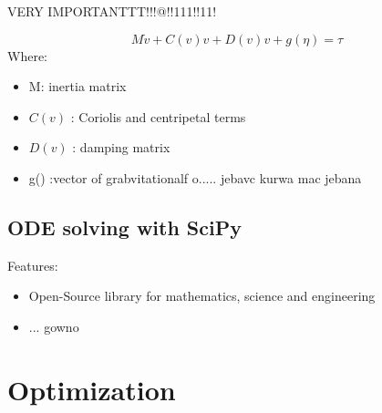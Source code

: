 VERY IMPORTANTTT!!!@!!111!!11!


{

    \begin{equation}
        M\dot{v} + C(v)v + D(v)v + g(\eta) = \tau
    \end{equation}
    Where:
    \begin{itemize}
        \item M: inertia matrix\\
        \item $C(v)$ : Coriolis and centripetal terms
        \item $D(v)$ : damping matrix\\
        \item g(\eta) :vector of grabvitationalf o.....
            jebavc kurwa mac jebana
    \end{itemize}

}
\subsection{ODE solving with SciPy}
Features:
\begin{itemize}
    \item Open-Source library for mathematics, science and engineering
    \item ... gowno
\end{itemize}


\section{Optimization}

